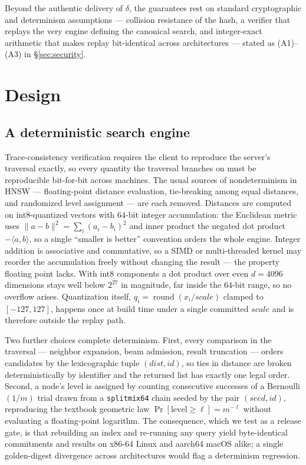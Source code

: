 \documentclass[11pt]{article}
\begin{document}
Beyond the authentic delivery of $\delta$, the guarantees rest on
standard cryptographic and determinism assumptions --- collision
resistance of the hash, a verifier that replays the very engine defining
the canonical search, and integer-exact arithmetic that makes replay
bit-identical across architectures --- stated as (A1)--(A3) in
\S\ref{sec:security}.

\section{Design}\label{sec:design}

\subsection{A deterministic search engine}

Trace-consistency verification requires the client to reproduce the
server's traversal exactly, so every quantity the traversal branches on
must be reproducible bit-for-bit across machines. The usual sources of
nondeterminism in HNSW --- floating-point distance evaluation,
tie-breaking among equal distances, and randomized level assignment ---
are each removed. Distances are computed on int8-quantized vectors with
$64$-bit integer accumulation: the Euclidean metric uses $\lVert
a-b\rVert^2=\sum_i (a_i-b_i)^2$ and inner product the negated dot
product $-\langle a,b\rangle$, so a single ``smaller is better''
convention orders the whole engine. Integer addition is associative and
commutative, so a SIMD or multi-threaded kernel may reorder the
accumulation freely without changing the result --- the property
floating point lacks. With int8 components a dot product over even
$d=4096$ dimensions stays well below $2^{27}$ in magnitude, far inside
the $64$-bit range, so no overflow arises. Quantization itself,
$q_i=\operatorname{round}(x_i/\mathit{scale})$ clamped to $[-127,127]$,
happens once at build time under a single committed $\mathit{scale}$ and
is therefore outside the replay path.

Two further choices complete determinism. First, every comparison in the
traversal --- neighbor expansion, beam admission, result truncation ---
orders candidates by the lexicographic tuple
$(\mathit{dist},\mathit{id})$, so ties in distance are broken
deterministically by identifier and the returned list has exactly one
legal order. Second, a node's level is assigned by counting consecutive
successes of a Bernoulli$(1/m)$ trial drawn from a \texttt{splitmix64}
chain seeded by the pair $(\mathit{seed},\mathit{id})$, reproducing the
textbook geometric law $\Pr[\mathrm{level}\ge\ell]=m^{-\ell}$ without
evaluating a floating-point logarithm. The consequence, which we test as
a release gate, is that rebuilding an index and re-running any query
yield byte-identical commitments and results on x86-64 Linux and aarch64
macOS alike; a single golden-digest divergence across architectures
would flag a determinism regression.
\end{document}
